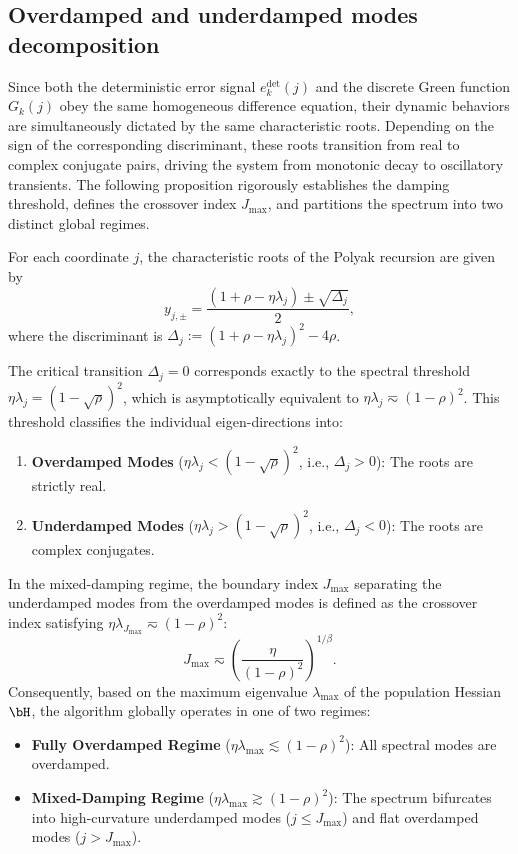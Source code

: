 \documentclass[11pt]{article}
\begin{document}
\subsection{Overdamped and underdamped modes decomposition}
\label{app:pol_decomp_modes}

Since both the deterministic error signal $e_k^{\mathrm{det}}(j)$ and the discrete Green function $G_k(j)$ obey the  same homogeneous difference equation, their dynamic behaviors are simultaneously dictated by the same characteristic roots. Depending on the sign of the corresponding discriminant, these roots transition from real to complex conjugate pairs, driving the system from monotonic decay to oscillatory transients. The following proposition rigorously establishes the damping threshold, defines the crossover index $J_{\max}$, and partitions the spectrum into two distinct global regimes.

\begin{proposition}
\label{prop:pol_mode_decomposition}
For each coordinate $j$, the characteristic roots of the Polyak recursion are given by
\[
    y_{j, \pm} = \frac{(1+\rho-\eta\lambda_j) \pm \sqrt{\Delta_j}}{2},
\]
where the discriminant is $\Delta_j := (1+\rho-\eta\lambda_j)^2 - 4\rho$. 

The critical transition $\Delta_j = 0$ corresponds exactly to the spectral threshold $\eta\lambda_j = (1-\sqrt{\rho})^2$, which is asymptotically equivalent to $\eta\lambda_j \eqsim (1-\rho)^2$. This threshold classifies the individual eigen-directions into:
\begin{enumerate}
    \item \textbf{Overdamped Modes} ($\eta\lambda_j < (1-\sqrt{\rho})^2$, i.e., $\Delta_j > 0$): The roots are strictly real.
    \item \textbf{Underdamped Modes} ($\eta\lambda_j > (1-\sqrt{\rho})^2$, i.e., $\Delta_j < 0$): The roots are complex conjugates.
\end{enumerate}
In the mixed-damping regime, the boundary index $J_{\max}$ separating the underdamped modes from the overdamped modes is defined as the crossover index satisfying $\eta\lambda_{J_{\max}} \eqsim (1-\rho)^2$:
\begin{equation}
\label{eq:J_max}
    J_{\max} \eqsim \left(\frac{\eta}{(1-\rho)^2}\right)^{1/\beta}.
\end{equation}
Consequently, based on the maximum eigenvalue $\lambda_{\max}$ of the population Hessian $\bH$, the algorithm globally operates in one of two regimes:
\begin{itemize}
    \item \textbf{Fully Overdamped Regime} ($\eta\lambda_{\max} \lesssim (1-\rho)^2$): All spectral modes are overdamped.
    \item \textbf{Mixed-Damping Regime} ($\eta\lambda_{\max} \gtrsim (1-\rho)^2$): The spectrum bifurcates into high-curvature underdamped modes ($j \le J_{\max}$) and flat overdamped modes ($j > J_{\max}$).
\end{itemize}
\end{proposition}
\end{document}
